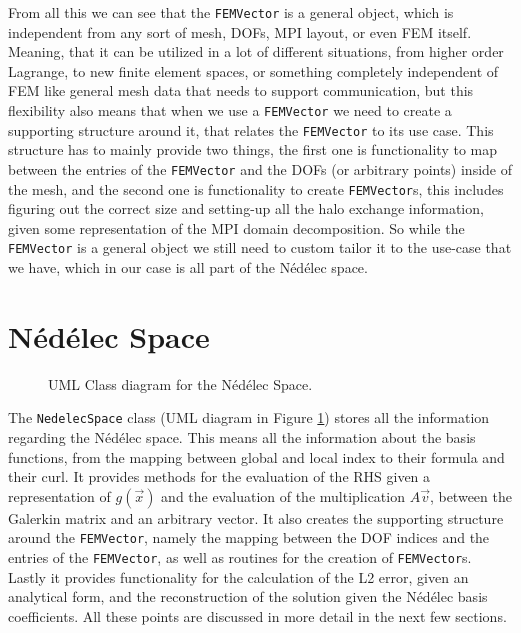 From all this we can see that the \texttt{FEMVector} is a general object, which is independent from any sort of mesh, DOFs, MPI layout, or even FEM itself. Meaning, that it can be utilized in a lot of different situations, from higher order Lagrange, to new finite element spaces, or something completely independent of FEM like general mesh data that needs to support communication, but this flexibility also means that when we use a \texttt{FEMVector} we need to create a supporting structure around it, that relates the \texttt{FEMVector} to its use case. This structure has to mainly provide two things, the first one is functionality to map between the entries of the \texttt{FEMVector} and the DOFs (or arbitrary points) inside of the mesh, and the second one is functionality to create \texttt{FEMVector}s, this includes figuring out the correct size and setting-up all the halo exchange information, given some representation of the MPI domain decomposition. So while the \texttt{FEMVector} is a general object we still need to custom tailor it to the use-case that we have, which in our case is all part of the Nédélec space.

\section{Nédélec Space}
\begin{figure}[!ht]
    \centering
    
    \caption{UML Class diagram for the Nédélec Space.}
    \label{fig:uml_nedelec_space}
\end{figure}
The \texttt{NedelecSpace} class (UML diagram in Figure \ref{fig:uml_nedelec_space}) stores all the information regarding the Nédélec space. This means all the information about the basis functions, from the mapping between global and local index to their formula and their curl. It provides methods for the evaluation of the RHS given a representation of \(g(\vec{x})\) and the evaluation of the multiplication \(A\vec{v}\), between the Galerkin matrix and an arbitrary vector. It also creates the supporting structure around the \texttt{FEMVector}, namely the mapping between the DOF indices and the entries of the \texttt{FEMVector}, as well as routines for the creation of \texttt{FEMVector}s. Lastly it provides functionality for the calculation of the L2 error, given an analytical form, and the reconstruction of the solution given the Nédélec basis coefficients. All these points are discussed in more detail in the next few sections.


